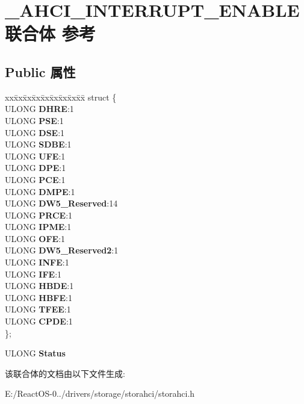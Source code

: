 \hypertarget{union___a_h_c_i___i_n_t_e_r_r_u_p_t___e_n_a_b_l_e}{}\section{\+\_\+\+A\+H\+C\+I\+\_\+\+I\+N\+T\+E\+R\+R\+U\+P\+T\+\_\+\+E\+N\+A\+B\+L\+E联合体 参考}
\label{union___a_h_c_i___i_n_t_e_r_r_u_p_t___e_n_a_b_l_e}
\subsection*{Public 属性}
\begin{DoxyCompactItemize}
\item 
\mbox{\label{union___a_h_c_i___i_n_t_e_r_r_u_p_t___e_n_a_b_l_e_ab9b899d8ab0734ce57ffe3311daad390}} 
\begin{tabbing}
xx\=xx\=xx\=xx\=xx\=xx\=xx\=xx\=xx\=\kill
struct \{\\
\>ULONG {\bfseries DHRE}:1\\
\>ULONG {\bfseries PSE}:1\\
\>ULONG {\bfseries DSE}:1\\
\>ULONG {\bfseries SDBE}:1\\
\>ULONG {\bfseries UFE}:1\\
\>ULONG {\bfseries DPE}:1\\
\>ULONG {\bfseries PCE}:1\\
\>ULONG {\bfseries DMPE}:1\\
\>ULONG {\bfseries DW5\_Reserved}:14\\
\>ULONG {\bfseries PRCE}:1\\
\>ULONG {\bfseries IPME}:1\\
\>ULONG {\bfseries OFE}:1\\
\>ULONG {\bfseries DW5\_Reserved2}:1\\
\>ULONG {\bfseries INFE}:1\\
\>ULONG {\bfseries IFE}:1\\
\>ULONG {\bfseries HBDE}:1\\
\>ULONG {\bfseries HBFE}:1\\
\>ULONG {\bfseries TFEE}:1\\
\>ULONG {\bfseries CPDE}:1\\
\}; \\

\end{tabbing}\item 
\mbox{\label{union___a_h_c_i___i_n_t_e_r_r_u_p_t___e_n_a_b_l_e_a1d13912e1b501ba187ca6a427c4b502c}} 
U\+L\+O\+NG {\bfseries Status}
\end{DoxyCompactItemize}


该联合体的文档由以下文件生成\+:\begin{DoxyCompactItemize}
\item 
E\+:/\+React\+O\+S-\/0../drivers/storage/storahci/storahci.\+h\end{DoxyCompactItemize}
